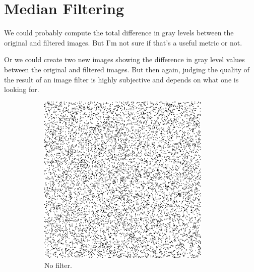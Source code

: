 \section{Median Filtering}
We could probably compute the total difference in gray levels between the original and filtered images.
But I'm not sure if that's a useful metric or not.

Or we could create two new images showing the difference in gray level values between the original and filtered images.
But then again, judging the quality of the result of an image filter is highly subjective and depends on what one is looking for.

\begin{figure}[h]
    \centering

    \begin{subfigure}[b]{0.3\textwidth}
        \includegraphics[width=0.9\textwidth]{../code/2_out/2-1_sp.png}
        \caption{No filter.}
        \label{fig:2-2-1:1}
    \end{subfigure}
    \begin{subfigure}[b]{0.3\textwidth}

\end{subfigure}
\end{figure}
